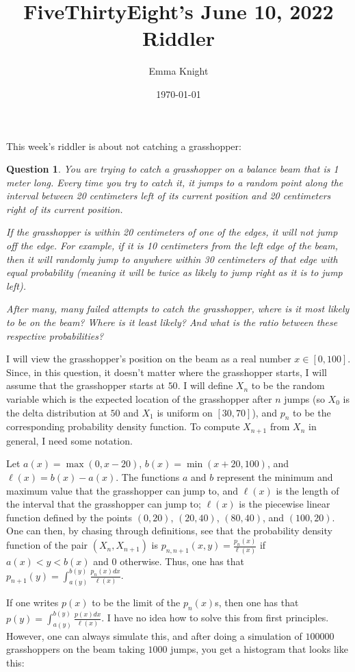 \documentclass[11pt]{article}
\title{FiveThirtyEight's June 10, 2022 Riddler}
\author{Emma Knight}
\date{\today}
\newtheorem{question}[theorem]{Question}
\theoremstyle{definition}
\begin{document}
\maketitle
This week's riddler is about not catching a grasshopper:
\begin{question}
You are trying to catch a grasshopper on a balance beam that is 1 meter long. Every time you try to catch it, it jumps to a random point along the interval between 20 centimeters left of its current position and 20 centimeters right of its current position.

If the grasshopper is within 20 centimeters of one of the edges, it will not jump off the edge. For example, if it is 10 centimeters from the left edge of the beam, then it will randomly jump to anywhere within 30 centimeters of that edge with equal probability (meaning it will be twice as likely to jump right as it is to jump left).

After many, many failed attempts to catch the grasshopper, where is it most likely to be on the beam? Where is it least likely? And what is the ratio between these respective probabilities?
\end{question}

I will view the grasshopper's position on the beam as a real number $x \in [0, 100]$.  Since, in this question, it doesn't matter where the grasshopper starts, I will assume that the grasshopper starts at $50$.  I will define $X_n$ to be the random variable which is the expected location of the grasshopper after $n$ jumps (so $X_0$ is the delta distribution at $50$ and $X_1$ is uniform on $[30, 70]$), and $p_n$ to be the corresponding probability density function.  To compute $X_{n+1}$ from $X_n$ in general, I need some notation.

Let $a(x) = \max(0, x-20)$, $b(x) = \min(x+20, 100)$, and $\ell(x) = b(x)-a(x)$.  The functions $a$ and $b$ represent the minimum and maximum value that the grasshopper can jump to, and $\ell(x)$ is the length of the interval that the grasshopper can jump to; $\ell(x)$ is the piecewise linear function defined by the points $(0, 20)$, $(20, 40)$, $(80, 40)$, and $(100, 20)$.  One can then, by chasing through definitions, see that the probability density function of the pair $(X_n, X_{n+1})$ is $p_{n, n+1}(x, y) = \frac{p_n(x)}{\ell(x)}$ if $a(x) < y < b(x)$ and $0$ otherwise.  Thus, one has that $\displaystyle{p_{n+1}(y) = \int_{a(y)}^{b(y)} \frac{p_n(x)dx}{\ell(x)}}$.

If one writes $p(x)$ to be the limit of the $p_n(x)$s, then one has that $\displaystyle{p(y) = \int_{a(y)}^{b(y)} \frac{p(x)dx}{\ell(x)}}$.  I have no idea how to solve this from first principles.  However, one can always simulate this, and after doing a simulation of $100000$ grasshoppers on the beam taking $1000$ jumps, you get a histogram that looks like this:
\end{document}
